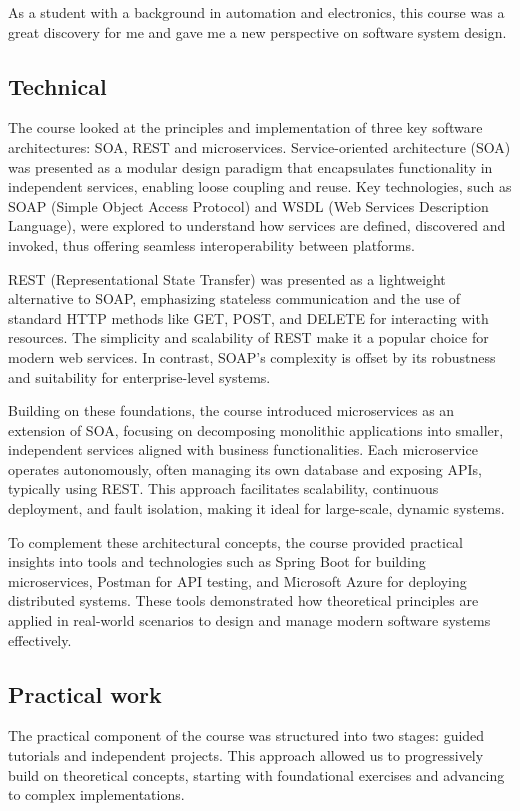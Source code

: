 As a student with a background in automation and electronics, this course was a great discovery for me and gave me a new perspective on software system design. 

\subsection{Technical}
\indent \indent The course looked at the principles and implementation of three key software architectures: SOA, REST and microservices.
Service-oriented architecture (SOA) was presented as a modular design paradigm that encapsulates functionality in independent services, enabling loose coupling and reuse.
Key technologies, such as SOAP (Simple Object Access Protocol) and WSDL (Web Services Description Language), were explored to understand how services are defined, discovered and invoked, thus offering seamless interoperability between platforms.
\vspace{0.25cm}

REST (Representational State Transfer) was presented as a lightweight alternative to SOAP, emphasizing stateless communication and the use of standard HTTP methods like GET, POST, and DELETE for interacting with resources. 
The simplicity and scalability of REST make it a popular choice for modern web services. 
In contrast, SOAP's complexity is offset by its robustness and suitability for enterprise-level systems.
\vspace{0.25cm}

Building on these foundations, the course introduced microservices as an extension of SOA, focusing on decomposing monolithic applications into smaller, independent services aligned with business functionalities. 
Each microservice operates autonomously, often managing its own database and exposing APIs, typically using REST. This approach facilitates scalability, continuous deployment, and fault isolation, making it ideal for large-scale, dynamic systems.
\vspace{0.25cm}

To complement these architectural concepts, the course provided practical insights into tools and technologies such as Spring Boot for building microservices, Postman for API testing, and Microsoft Azure for deploying distributed systems. 
These tools demonstrated how theoretical principles are applied in real-world scenarios to design and manage modern software systems effectively.

\subsection{Practical work}
The practical component of the course was structured into two stages: guided tutorials and independent projects. This approach allowed us to progressively build on theoretical concepts, starting with foundational exercises and advancing to complex implementations.

